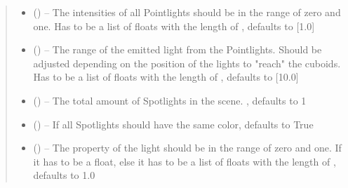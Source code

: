 \documentclass[letterpaper,10pt,english]{sphinxmanual}
\begin{document}
\begin{fulllineitems}
\begin{fulllineitems}
\begin{quote}
\begin{description}
\begin{itemize}
\item {} 
 (\sphinxstyleliteralemphasis{\sphinxupquote{, }}) -- The intensities of all Pointlights should be in the range of zero and one. Has to be a list of floats with the length of , defaults to {[}1.0{]}

\item {} 
 (\sphinxstyleliteralemphasis{\sphinxupquote{, }}) -- The range of the emitted light from the Pointlights. Should be adjusted depending on the position of the lights to "reach" the cuboids. Has to be a list of floats with the length of , defaults to {[}10.0{]}

\item {} 
 (\sphinxstyleliteralemphasis{\sphinxupquote{, }}) -- The total amount of Spotlights in the scene. , defaults to 1

\item {} 
 (\sphinxstyleliteralemphasis{\sphinxupquote{, }}) -- If all Spotlights should have the same color, defaults to True

\item {} 
 (\sphinxstyleliteralemphasis{\sphinxupquote{, }}) -- The  property of the light should be in the range of zero and one. If  it has to be a float, else it has to be a list of floats with the length of , defaults to 1.0


\end{itemize}
\end{description}
\end{quote}
\end{fulllineitems}
\end{fulllineitems}
\end{document}
